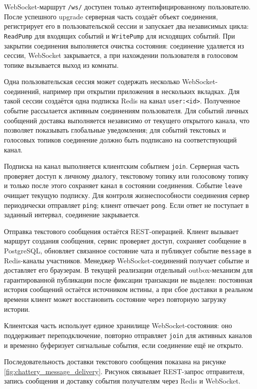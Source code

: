 \documentclass[a4paper,12pt]{extarticle}
\begin{document}
WebSocket-маршрут \texttt{/ws/} доступен только аутентифицированному пользователю. После успешного upgrade серверная часть создаёт объект соединения, регистрирует его в пользовательской сессии и запускает два независимых цикла: \texttt{ReadPump} для входящих событий и \texttt{WritePump} для исходящих событий. При закрытии соединения выполняется очистка состояния: соединение удаляется из сессии, WebSocket закрывается, а при нахождении пользователя в голосовом топике вызывается выход из комнаты.

Одна пользовательская сессия может содержать несколько WebSocket-соединений, например при открытии приложения в нескольких вкладках. Для такой сессии создаётся одна подписка Redis на канал \texttt{user:<id>}. Полученное событие рассылается активным соединениям пользователя. Для событий личных сообщений доставка выполняется независимо от текущего открытого канала, что позволяет показывать глобальные уведомления; для событий текстовых и голосовых топиков соединение должно быть подписано на соответствующий канал.

Подписка на канал выполняется клиентским событием \texttt{join}. Серверная часть проверяет доступ к личному диалогу, текстовому топику или голосовому топику и только после этого сохраняет канал в состоянии соединения. Событие \texttt{leave} очищает текущую подписку. Для контроля жизнеспособности соединения сервер периодически отправляет \texttt{ping}; клиент отвечает \texttt{pong}. Если ответ не поступает в заданный интервал, соединение закрывается.

Отправка текстового сообщения остаётся REST-операцией. Клиент вызывает маршрут создания сообщения, сервис проверяет доступ, сохраняет сообщение в PostgreSQL, обновляет связанное состояние чата и публикует событие \texttt{message} в Redis-каналы участников. Менеджер WebSocket-соединений получает событие и доставляет его браузерам. В текущей реализации отдельный outbox-механизм для гарантированной публикации после фиксации транзакции не выделен: постоянная история сообщений остаётся источником истины, а при сбое доставки в реальном времени клиент может восстановить состояние через повторную загрузку истории.

Клиентская часть использует единое хранилище WebSocket-состояния: оно поддерживает переподключение, повторно отправляет \texttt{join} для активных каналов и временно буферизует сигнальные события, если соединение ещё не открыто.

Последовательность доставки текстового сообщения показана на рисунке \ref{fig:chattery_message_delivery}. Рисунок связывает REST-запрос отправителя, запись сообщения и доставку события получателям через Redis и WebSocket.
\end{document}
